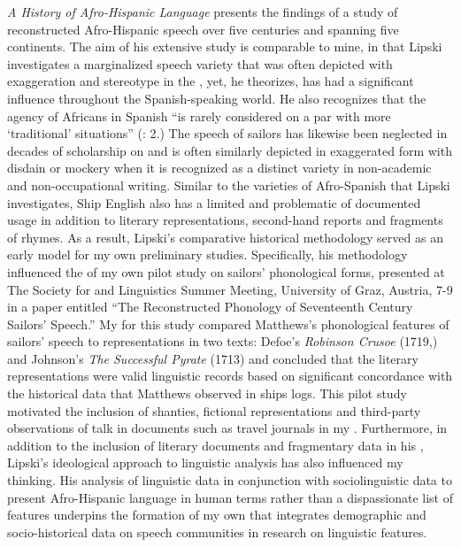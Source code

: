  \textit{A History of Afro-Hispanic Language} presents the findings of a study of reconstructed Afro-Hispanic speech over five centuries and spanning five continents. The aim of his extensive study is comparable to mine, in that Lipski investigates a marginalized speech variety that was often depicted with exaggeration and stereotype in the , yet, he theorizes, has had a significant influence throughout the Spanish-speaking world. He also recognizes that the agency of Africans in Spanish  “is rarely considered on a par with more ‘traditional’  situations” (\citealt{Lipski2005}: 2.) The speech of sailors has likewise been neglected in decades of scholarship on  and is often similarly depicted in exaggerated form with disdain or mockery when it is recognized as a distinct variety in non-academic and non-occupational writing. Similar to the varieties of Afro-Spanish that Lipski investigates, Ship English also has a limited and problematic  of documented usage in addition to literary representations, second-hand reports and fragments of rhymes. As a result, Lipski’s comparative historical methodology served as an early model for my own preliminary studies. Specifically, his methodology influenced the  of my own pilot study on  sailors’ phonological forms, presented at The Society for  and  Linguistics Summer Meeting, University of Graz, Austria, 7-9 \citealt{July2015} in a paper entitled “The Reconstructed Phonology of Seventeenth Century Sailors’ Speech.” My  for this study compared Matthews’s phonological features of  sailors’ speech to representations in two texts: Defoe’s \textit{Robinson Crusoe} (1719,) and Johnson’s \textit{The Successful Pyrate} (1713) and concluded that the literary representations were valid linguistic records based on significant concordance with the historical data that Matthews observed in ships logs. This pilot study motivated the inclusion of shanties, fictional representations and third-party observations of  talk in documents such as travel journals in my . Furthermore, in addition to the inclusion of literary documents and fragmentary data in his , Lipski’s ideological approach to linguistic analysis has also influenced my thinking. His analysis of linguistic data in conjunction with sociolinguistic data to present Afro-Hispanic language in human terms rather than a dispassionate list of features underpins the formation of my own  that integrates demographic and socio-historical data on speech communities in research on linguistic features.

